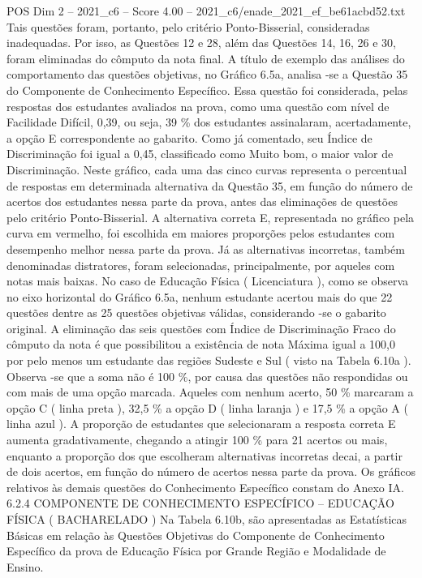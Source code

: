 \begin{textsample}{POS Dim 2 – 2021\_c6 – Score 4.00 – 2021\_c6/enade\_2021\_ef\_be61acbd52.txt}
Tais questões foram, portanto, pelo critério Ponto-Bisserial, consideradas inadequadas.
Por isso, as Questões 12 e 28, além das Questões 14, 16, 26 e 30, foram eliminadas do cômputo da nota final.
A título de exemplo das análises do comportamento das questões objetivas, no Gráfico 6.5a, analisa -se a Questão 35 do Componente de Conhecimento Específico.
Essa questão foi considerada, pelas respostas dos estudantes avaliados na prova, como uma questão com nível de Facilidade Difícil, 0,39, ou seja, 39 \% dos estudantes assinalaram, acertadamente, a opção E correspondente ao gabarito.
Como já comentado, seu Índice de Discriminação foi igual a 0,45, classificado como Muito bom, o maior valor de Discriminação.
Neste gráfico, cada uma das cinco curvas representa o percentual de respostas em determinada alternativa da Questão 35, em função do número de acertos dos estudantes nessa parte da prova, antes das eliminações de questões pelo critério Ponto-Bisserial.
A alternativa correta E, representada no gráfico pela curva em vermelho, foi escolhida em maiores proporções pelos estudantes com desempenho melhor nessa parte da prova.
Já as alternativas incorretas, também denominadas distratores, foram selecionadas, principalmente, por aqueles com notas mais baixas.
No caso de Educação Física ( Licenciatura ), como se observa no eixo horizontal do Gráfico 6.5a, nenhum estudante acertou mais do que 22 questões dentre as 25 questões objetivas válidas, considerando -se o gabarito original.
A eliminação das seis questões com Índice de Discriminação Fraco do cômputo da nota é que possibilitou a existência de nota Máxima igual a 100,0 por pelo menos um estudante das regiões Sudeste e Sul ( visto na Tabela 6.10a ).
Observa -se que a soma não é 100 \%, por causa das questões não respondidas ou com mais de uma opção marcada.
Aqueles com nenhum acerto, 50 \% marcaram a opção C ( linha preta ), 32,5 \% a opção D ( linha laranja ) e 17,5 \% a opção A ( linha azul ).
A proporção de estudantes que selecionaram a resposta correta E aumenta gradativamente, chegando a atingir 100 \% para 21 acertos ou mais, enquanto a proporção dos que escolheram alternativas incorretas decai, a partir de dois acertos, em função do número de acertos nessa parte da prova.
Os gráficos relativos às demais questões do Conhecimento Específico constam do Anexo IA. 6.2.4 COMPONENTE DE CONHECIMENTO ESPECÍFICO – EDUCAÇÃO FÍSICA ( BACHARELADO ) Na Tabela 6.10b, são apresentadas as Estatísticas Básicas em relação às Questões Objetivas do Componente de Conhecimento Específico da prova de Educação Física por Grande Região e Modalidade de Ensino.

\end{textsample}
